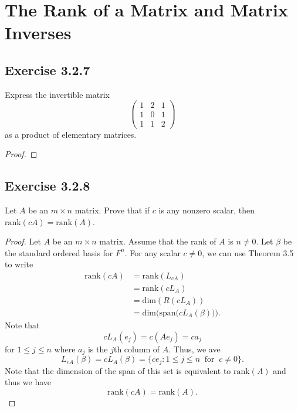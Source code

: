 \section{The Rank of a Matrix and Matrix Inverses}

\subsection*{Exercise 3.2.7} Express the invertible matrix 
\[ 
    \begin{pmatrix}
        1 & 2 & 1 \\
        1 & 0 & 1 \\
        1 & 1 & 2
    \end{pmatrix}
\]
as a product of elementary matrices.
\begin{proof}

\end{proof}

\subsection*{Exercise 3.2.8} Let \( A  \) be an \( m \times n  \) matrix. Prove that if \( c  \) is any nonzero scalar, then \( \text{rank}(cA) = \text{rank}(A) \).
\begin{proof}
Let \( A  \) be an \( m \times n  \) matrix. Assume that the rank of \( A  \) is \( n \neq 0  \). Let \( \beta \) be the standard ordered basis for \( F^{n} \). For any scalar \( c \neq 0  \), we can use Theorem 3.5 to write
    \begin{align*}
        \text{rank}(cA) &= \text{rank}({L}_{cA}) \\
                        &= \text{rank}(c {L}_{A}) \tag{Part (c) of Theorem 2.15} \\
                        &= \text{dim}(R(c {L}_{A})) \\
                        &= \text{dim}\Big(\text{span}\big(c {L}_{A} (\beta)\big)\Big). \tag{1}
    \end{align*}
    Note that 
    \[ {cL}_{A}({e}_{j}) = c (A {e}_{j}) = c {a}_{j} \]
    for \(  1 \leq j \leq n  \) where \( {a}_{j}  \) is the \( j  \)th column of \( A  \). Thus, we ave
    \[  {L}_{cA}(\beta) = c {L}_{A}(\beta) = \{ {ce}_{j} : 1 \leq  j \leq n \ \text{ for } \ c \neq 0  \}.  \]
    Note that the dimension of the span of this set is equivalent to \( \text{rank}(A) \) and thus we have
    \[  \text{rank}(cA) = \text{rank}(A).  \]
\end{proof}


